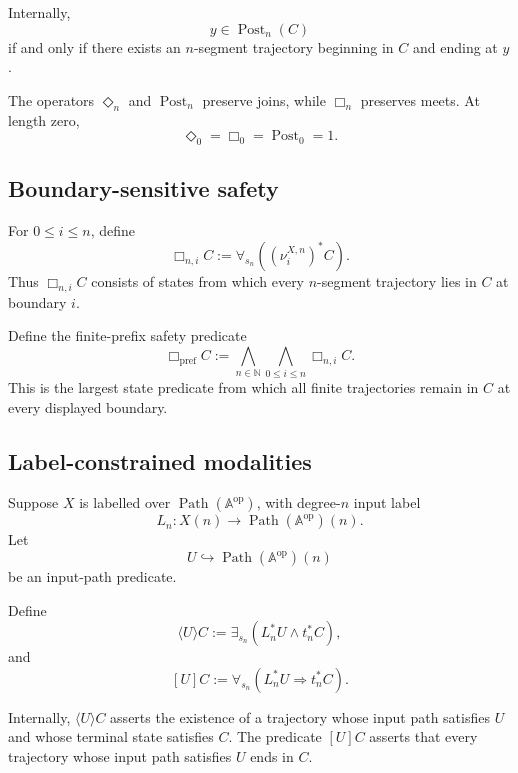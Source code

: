 Internally,
\[
    y\in\operatorname{Post}_n(C)
\]
if and only if there exists an \(n\)-segment trajectory beginning in \(C\)
and ending at \(y\).

The operators \(\Diamond_n\) and \(\operatorname{Post}_n\) preserve joins,
while \(\Box_n\) preserves meets. At length zero,
\[
    \Diamond_0
    =
    \Box_0
    =
    \operatorname{Post}_0
    =
    1.
\]

\subsection{Boundary-sensitive safety}
\label{subsec:boundary-sensitive-safety}

For \(0\leq i\leq n\), define
\[
    \Box_{n,i}C
    :=
    \forall_{s_n}
    \left(
        (\nu_i^{X,n})^\ast C
    \right).
\]
Thus \(\Box_{n,i}C\) consists of states from which every \(n\)-segment
trajectory lies in \(C\) at boundary \(i\).

Define the finite-prefix safety predicate
\[
    \Box_{\mathrm{pref}}C
    :=
    \bigwedge_{n\in\mathbb N}
    \bigwedge_{0\leq i\leq n}
    \Box_{n,i}C.
\]
This is the largest state predicate from which all finite trajectories remain
in \(C\) at every displayed boundary.

\subsection{Label-constrained modalities}
\label{subsec:label-constrained-modalities}

Suppose \(X\) is labelled over
\(\operatorname{Path}(\mathbb A^{\mathrm{op}})\), with degree-\(n\) input
label
\[
    L_n:X(n)\to\operatorname{Path}(\mathbb A^{\mathrm{op}})(n).
\]
Let
\[
    U\hookrightarrow
    \operatorname{Path}(\mathbb A^{\mathrm{op}})(n)
\]
be an input-path predicate.

\begin{definition}
\label{def:action-indexed-temporal-modalities}
Define
\[
    \langle U\rangle C
    :=
    \exists_{s_n}
    \left(
        L_n^\ast U
        \wedge
        t_n^\ast C
    \right),
\]
and
\[
    [U]C
    :=
    \forall_{s_n}
    \left(
        L_n^\ast U
        \Rightarrow
        t_n^\ast C
    \right).
\]
\end{definition}

Internally, \(\langle U\rangle C\) asserts the existence of a trajectory
whose input path satisfies \(U\) and whose terminal state satisfies \(C\).
The predicate \([U]C\) asserts that every trajectory whose input path
satisfies \(U\) ends in \(C\).

